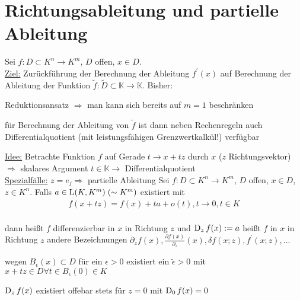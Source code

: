 \section{Richtungsableitung und partielle Ableitung}

Sei $f:D \subset K^n \to K^m$, $D$ offen, $x\in D$.\\
\underline{Ziel:} Zurückführung der Berechnung der Ableitung $f^{'}(x)$ auf Berechnung der Ableitung der Funktion $\tilde{f} : \tilde{D} \subset \mathbb{K} \to \mathbb{K}$. Bisher:

\begin{compactitem}
    \item Reduktionsansatz $\Longrightarrow$ man kann sich bereits auf $m=1$ beschränken
    \item für Berechnung der Ableitung von $\tilde{f}$ ist dann neben Rechenregeln auch Differentialquotient (mit leistungsfähigen Grenzwertkalkül!) verfügbar
\end{compactitem}

\underline{Idee:} Betrachte Funktion $f$ auf Gerade $t \to x + tz$ durch $x$ ($z$ Richtungsvektor) $\Longrightarrow$ skalares Argument $t \in \mathbb{K} \longrightarrow$ Differentialquotient\\
\underline{Spezialfälle:} $z=e_j \Rightarrow$ partielle Ableitung
Sei $f:D \subset K^n \to K^m$, $D$ offen, $x \in D$, $z \in K^n$. Falls $a \in \operatorname{L}(K,K^m)\;(\sim K^m)$ existiert mit
\begin{align}
f(x+tz) = f(x) +ta + o(t), t \to 0, t \in K\\
\end{align}

dann heißt $f$ differenzierbar in $x$ in Richtung $z$ und $\operatorname{D}_z f(x):= a$ heißt  $f$ in $x$ in Richtung $z$ andere Bezeichnungen $\partial_z f(x), \frac{\partial f(x)}{\partial_z}(x), \delta f(x;z), f^{'}(x;z), \dots$

\begin{bemerkung}
    \begin{compactitem}
        \item wegen $B_{\epsilon}(x) \subset D$ für ein $\epsilon > 0$ existiert ein $\tilde{\epsilon} > 0$ mit $x+tz \in D \forall t \in B_{\epsilon}(0) \in K$
        \item $\operatorname{D}_z f(x)$ existiert offebar stets für $z=0$ mit $\operatorname{D}_0 f(x) = 0$
    \end{compactitem}
\end{bemerkung}

